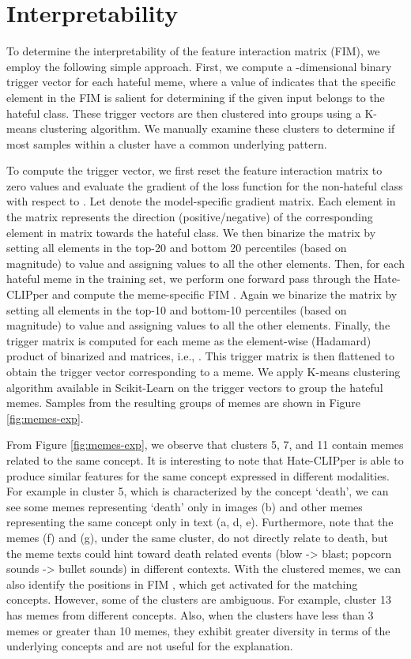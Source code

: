 \documentclass[11pt]{article}
\begin{document}
\section{Interpretability}

To determine the interpretability of the feature interaction matrix (FIM), we employ the following simple approach. First, we compute a -dimensional binary trigger vector for each hateful meme, where a value of  indicates that the specific element in the FIM  is salient for determining if the given input belongs to the hateful class. These trigger vectors are then clustered into groups using a K-means clustering algorithm. We manually examine these clusters to determine if most samples within a cluster have a common underlying pattern.

To compute the trigger vector, we first reset the feature interaction matrix  to zero values and evaluate the gradient of the loss function for the non-hateful class with respect to . Let  denote the model-specific gradient matrix. Each element in the  matrix represents the direction (positive/negative) of the corresponding element in  matrix towards the hateful class. We then binarize the  matrix by setting all elements in the top-20 and bottom 20 percentiles (based on magnitude) to value  and assigning  values to all the other elements. Then, for each hateful meme  in the training set, we perform one forward pass through the Hate-CLIPper and compute the meme-specific FIM . Again we binarize the  matrix by setting all elements in the top-10 and bottom-10 percentiles (based on magnitude) to value  and assigning  values to all the other elements. Finally, the trigger matrix  is computed for each meme as the element-wise (Hadamard) product of binarized  and  matrices, i.e., . This trigger matrix is then flattened to obtain the trigger vector corresponding to a meme. We apply K-means clustering algorithm available in Scikit-Learn \cite{scikit-learn} on the trigger vectors to group the hateful memes. Samples from the resulting groups of memes are shown in Figure \ref{fig:memes-exp}.

From Figure \ref{fig:memes-exp}, we observe that clusters 5, 7, and 11 contain memes related to the same concept. It is interesting to note that Hate-CLIPper is able to produce similar features for the same concept expressed in different modalities. For example in cluster 5, which is characterized by the concept `death', we can see some memes representing `death' only in images (b) and other memes  representing the same concept only in text (a, d, e). Furthermore, note that the memes (f) and (g), under the same cluster, do not directly relate to death, but the meme texts could hint toward death related events (blow -> blast; popcorn sounds -> bullet sounds) in different contexts. With the clustered memes, we can also identify the positions in FIM , which get activated for the matching concepts. However, some of the clusters are ambiguous. For example, cluster 13 has memes from different concepts. Also, when the clusters have less than 3 memes or greater than 10 memes, they exhibit greater diversity in terms of the underlying concepts and are not useful for the explanation.
\end{document}
